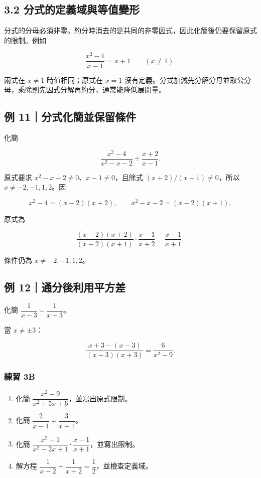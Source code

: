 \documentclass[11pt,a4paper]{article}
\providecommand{\tightlist}{%
  \setlength{\itemsep}{0pt}\setlength{\parskip}{0pt}}
\begin{document}
\subsection{3.2 分式的定義域與等值變形}\label{ux5206ux5f0fux7684ux5b9aux7fa9ux57dfux8207ux7b49ux503cux8b8aux5f62}

分式的分母必須非零。約分時消去的是共同的非零因式，因此化簡後仍要保留原式的限制。例如

\[
\frac{x^2-1}{x-1}=x+1\qquad(x\ne1).
\]

兩式在 \(x\ne1\) 時值相同；原式在 \(x=1\) 沒有定義。分式加減先分解分母並取公分母，乘除則先因式分解再約分，通常能降低展開量。

\subsection{例 11｜分式化簡並保留條件}\label{ux4f8b-11ux5206ux5f0fux5316ux7c21ux4e26ux4fddux7559ux689dux4ef6}

化簡

\[
\frac{x^2-4}{x^2-x-2}\div\frac{x+2}{x-1}.
\]

原式要求 \(x^2-x-2\ne0\)、\(x-1\ne0\)，且除式 \((x+2)/(x-1)\ne0\)，所以 \(x\ne-2,-1,1,2\)。因

\[
x^2-4=(x-2)(x+2),\qquad x^2-x-2=(x-2)(x+1),
\]

原式為

\[
\frac{(x-2)(x+2)}{(x-2)(x+1)}\cdot\frac{x-1}{x+2}
=\boxed{\frac{x-1}{x+1}},
\]

條件仍為 \(x\ne-2,-1,1,2\)。

\subsection{例 12｜通分後利用平方差}\label{ux4f8b-12ux901aux5206ux5f8cux5229ux7528ux5e73ux65b9ux5dee}

化簡 \(\dfrac1{x-3}-\dfrac1{x+3}\)。

當 \(x\ne\pm3\)：

\[
\frac{x+3-(x-3)}{(x-3)(x+3)}
=\boxed{\frac6{x^2-9}}.
\]

\subsubsection{練習 3B}\label{ux7df4ux7fd2-3b}

\begin{enumerate}
\def\labelenumi{\arabic{enumi}.}
\tightlist
\item
  化簡 \(\dfrac{x^2-9}{x^2+5x+6}\)，並寫出原式限制。
\item
  化簡 \(\dfrac2{x-1}+\dfrac3{x+1}\)。
\item
  化簡 \(\dfrac{x^2-1}{x^2-2x+1}\cdot\dfrac{x-1}{x+1}\)，並寫出限制。
\item
  解方程 \(\dfrac1{x-2}+\dfrac1{x+2}=\dfrac12\)，並檢查定義域。
\end{enumerate}
\end{document}
